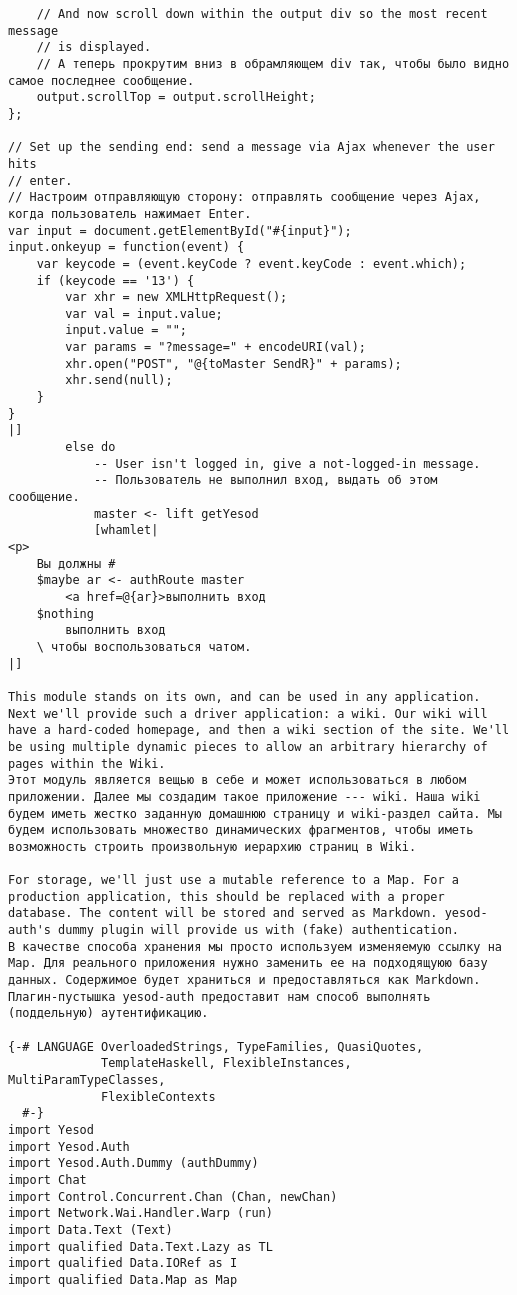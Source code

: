 \begin{lstlisting}
    // And now scroll down within the output div so the most recent message
    // is displayed.
    // А теперь прокрутим вниз в обрамляющем div так, чтобы было видно самое последнее сообщение.
    output.scrollTop = output.scrollHeight;
};

// Set up the sending end: send a message via Ajax whenever the user hits
// enter.
// Настроим отправляющую сторону: отправлять сообщение через Ajax, когда пользователь нажимает Enter.
var input = document.getElementById("#{input}");
input.onkeyup = function(event) {
    var keycode = (event.keyCode ? event.keyCode : event.which);
    if (keycode == '13') {
        var xhr = new XMLHttpRequest();
        var val = input.value;
        input.value = "";
        var params = "?message=" + encodeURI(val);
        xhr.open("POST", "@{toMaster SendR}" + params);
        xhr.send(null);
    }
}
|]
        else do
            -- User isn't logged in, give a not-logged-in message.
            -- Пользователь не выполнил вход, выдать об этом сообщение.
            master <- lift getYesod
            [whamlet|
<p>
    Вы должны #
    $maybe ar <- authRoute master
        <a href=@{ar}>выполнить вход
    $nothing
        выполнить вход
    \ чтобы воспользоваться чатом.
|]

This module stands on its own, and can be used in any application. Next we'll provide such a driver application: a wiki. Our wiki will have a hard-coded homepage, and then a wiki section of the site. We'll be using multiple dynamic pieces to allow an arbitrary hierarchy of pages within the Wiki.
Этот модуль является вещью в себе и может использоваться в любом приложении. Далее мы создадим такое приложение --- wiki. Наша wiki будем иметь жестко заданную домашнюю страницу и wiki-раздел сайта. Мы будем использовать множество динамических фрагментов, чтобы иметь возможность строить произвольную иерархию страниц в Wiki.

For storage, we'll just use a mutable reference to a Map. For a production application, this should be replaced with a proper database. The content will be stored and served as Markdown. yesod-auth's dummy plugin will provide us with (fake) authentication.
В качестве способа хранения мы просто используем изменяемую ссылку на Map. Для реального приложения нужно заменить ее на подходящуюю базу данных. Содержимое будет храниться и предоставляться как Markdown. Плагин-пустышка yesod-auth предоставит нам способ выполнять (поддельную) аутентификацию.

{-# LANGUAGE OverloadedStrings, TypeFamilies, QuasiQuotes,
             TemplateHaskell, FlexibleInstances, MultiParamTypeClasses,
             FlexibleContexts
  #-}
import Yesod
import Yesod.Auth
import Yesod.Auth.Dummy (authDummy)
import Chat
import Control.Concurrent.Chan (Chan, newChan)
import Network.Wai.Handler.Warp (run)
import Data.Text (Text)
import qualified Data.Text.Lazy as TL
import qualified Data.IORef as I
import qualified Data.Map as Map


\end{lstlisting}
